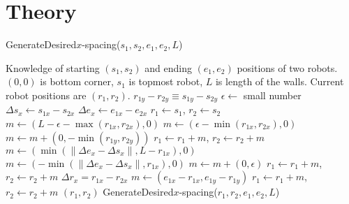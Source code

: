 \section{Theory}
\label{sec:theory}

\begin{algorithm}
\caption{GenerateDesired$x$-spacing($s_1,s_2,e_1,e_2,L$)}\label{alg:XControl}
\begin{algorithmic}[1]
\Require Knowledge of starting $(s_1,s_2)$ and ending $(e_1,e_2)$ positions of  two robots. 
$(0,0)$ is bottom corner, $s_1$ is topmost robot, 
 $L$ is length of the walls. Current robot positions are $(r_1,r_2)$.
\Ensure   $ r_{1y} - r_{2y}  \equiv s_{1y} - s_{2y} $   %
\State $\epsilon \gets $ small number
\State $ \Delta s_x  \gets s_{1x} - s_{2x} $
\State $ \Delta e_x \gets e_{1x} - e_{2x} $
\State $ r_1 \gets s_1$, $ r_2 \gets s_2$
\State $ m \gets ( L-\epsilon-\max( r_{1x},r_{2x}) ,0)   $ 
\Else 
\State  $ m \gets ( \epsilon-\min( r_{1x},r_{2x}),0 )    $ 
\EndIf
\State $m  \gets  m + (0, -\min( r_{1y},r_{2y} ))$ 
\State $ r_1 \gets r_1+m$, $ r_2 \gets r_2+m$ 
\State $ m \gets (\min(\|\Delta e_x - \Delta s_x \|, L- r_{1x}), 0)$  
\Else
\State $ m \gets (-\min(\|\Delta e_x - \Delta s_x \|, r_{1x}), 0)$
\EndIf 
\State $m  \gets  m + (0, \epsilon)$ 
\State $ r_1 \gets r_1+m$, $ r_2 \gets r_2+m$ 
\State $\Delta r_x = r_{1x} - r_{2x}$
\State   $ m \gets (e_{1x}-r_{1x}, e_{1y}-r_{1y})$
\State $ r_1 \gets r_1+m$, $ r_2 \gets r_2+m$ 
\State  \Return $(r_1,r_2)$
\Else   
\State \Return GenerateDesired$x$-spacing($r_1,r_2,e_1,e_2,L$)
\EndIf
\end{algorithmic}
\end{algorithm}

